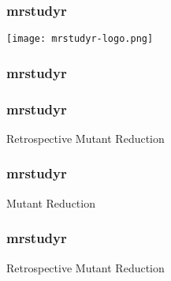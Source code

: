   \begin{frame}
    \frametitle{mrstudyr}
    \centering
    \texttt{[image: mrstudyr-logo.png]}
  \end{frame}

  \begin{frame}
    \frametitle{mrstudyr}
    \centering
    {}
  \end{frame}

  \begin{frame}
    \frametitle{mrstudyr}
    \centering
    {\HUGE Retrospective Mutant Reduction}
  \end{frame}

  \begin{frame}
    \frametitle{mrstudyr}
    \centering
    {\HUGE {\textcolor{solarizedViolet}{Retrospective}} Mutant Reduction}
  \end{frame}

  \begin{frame}
    \frametitle{mrstudyr}
    \centering
    {\HUGE Retrospective {\textcolor{solarizedViolet}{Mutant Reduction}}}
  \end{frame}
